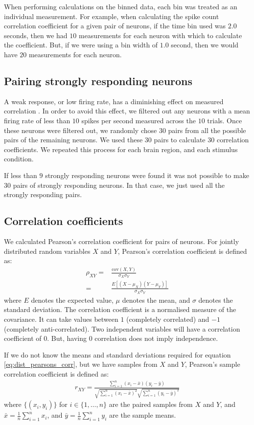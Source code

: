 \documentclass[a4paper,12pt]{article}
\theoremstyle{definition}
\newcommand{\cov}{\text{cov}} %
\begin{document}
When performing calculations on the binned data, each bin was treated as an individual measurement. For example, when calculating the spike count correlation coefficient for a given pair of neurons, if the time bin used was $2.0$ seconds, then we had $10$ measurements for each neuron with which to calculate the coefficient. But, if we were using a bin width of $1.0$ second, then we would have $20$ measurements for each neuron.

\subsection{Pairing strongly responding neurons}
A weak response, or low firing rate, has a diminishing effect on measured correlation \cite{cohen}. In order to avoid this effect, we filtered out any neurons with a mean firing rate of less than $10$ spikes per second measured across the $10$ trials. Once these neurons were filtered out, we randomly chose $30$ pairs from all the possible pairs of the remaining neurons. We used these $30$ pairs to calculate $30$ correlation coefficients. We repeated this process for each brain region, and each stimulus condition.

If less than $9$ strongly responding neurons were found it was not possible to make $30$ pairs of strongly responding neurons. In that case, we just used all the strongly responding pairs.

\subsection{Correlation coefficients}
We calculated Pearson's correlation coefficient for pairs of neurons. For jointly distributed random variables $X$ and $Y$, Pearson's correlation coefficient is defined as:
\begin{align}\label{eq:dist_pearsons_corr}
  \rho_{XY} =& \frac{\cov(X,Y)}{\sigma_X \sigma_Y} \\
            =& \frac{E[(X - \mu_X)(Y - \mu_Y)]}{\sigma_X \sigma_Y}
\end{align}
where $E$ denotes the expected value, $\mu$ denotes the mean, and $\sigma$ denotes the standard deviation. The correlation coefficient is a normalised measure of the covariance. It can take values between $1$ (completely correlated) and $-1$ (completely anti-correlated). Two independent variables will have a correlation coefficient of $0$. But, having $0$ correlation does not imply independence.

If we do not know the means and standard deviations required for equation \ref{eq:dist_pearsons_corr}, but we have samples from $X$ and $Y$, Pearson's sample correlation coefficient is defined as:
\begin{align}
  r_{XY} = \frac{\sum_{i=1}^n (x_i - \bar{x})(y_i - \bar{y})}{\sqrt{\sum_{i=1}^n (x_i - \bar{x})^2}\sqrt{\sum_{i=1}^n (y_i - \bar{y})^2}}
\end{align}
where $\lbrace (x_i, y_i) \rbrace$ for $i \in \lbrace 1, \dots, n \rbrace$ are the paired samples from $X$ and $Y$, and $\bar{x} = \frac{1}{n}\sum_{i=1}^n x_i$, and $\bar{y} = \frac{1}{n}\sum_{i=1}^n y_i$ are the sample means.
\end{document}
